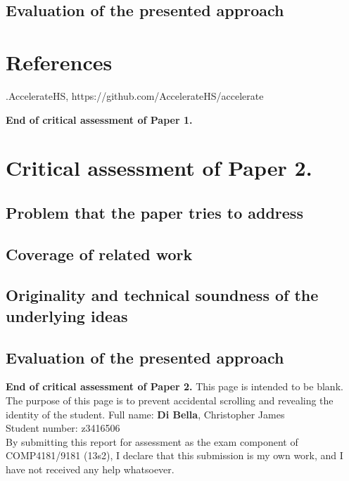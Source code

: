 \documentclass[9pt, twocolumn]{article}
\begin{document}
\subsection*{Evaluation of the presented approach}

\section*{References}
.\hspace{5mm}AccelerateHS, https://github.com/AccelerateHS/accelerate

\noindent
{\bf End of critical assessment of Paper 1.}
\clearpage
\section*{Critical assessment of Paper 2.}
\subsection*{Problem that the paper tries to address}
\subsection*{Coverage of related work}
\subsection*{Originality and technical soundness of the underlying ideas}
\subsection*{Evaluation of the presented approach}

\noindent
{\bf End of critical assessment of Paper 2.}
\clearpage
\noindent
This page is intended to be blank.\\

\noindent
The purpose of this page is to prevent accidental scrolling and revealing the identity of the student.
\clearpage
\noindent
Full name: \hspace{8mm} {\bf Di Bella}, Christopher James\\
Student number: z3416506\\

\noindent
By submitting this report for assessment as the exam component of COMP4181/9181 (13s2), I declare that this submission is my own work, and I have not received any help whatsoever.
\end{document}
